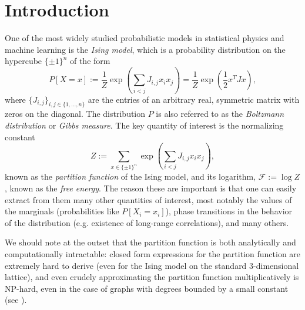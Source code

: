 \documentclass[11pt, oneside, english]{article}
\newcommand{\F}{\mathcal{F}}
\theoremstyle{definition}
\theoremstyle{plain}
\begin{document}
\section{Introduction}
One of the most widely studied probabilistic models in statistical physics and machine learning is the \emph{Ising model}, which is a probability distribution on the hypercube $\{\pm1\}^n$ of the form
\[ P[X = x] := \frac{1}{Z} \exp\left(\sum_{i < j} J_{i,j} x_i x_j\right) = \frac{1}{Z} \exp\left(\frac{1}{2} x^T J x\right), \]
where $\{J_{i,j}\}_{i,j\in\{1,\dots,n\}}$ are the entries of
an arbitrary real, symmetric matrix with zeros on the diagonal. The distribution $P$ is also referred to as the \emph{Boltzmann distribution} or \emph{Gibbs measure}. 
The key quantity of interest is the normalizing constant $$Z:=\sum_{x\in\{\pm1\}^{n}}\exp\left(\sum_{i < j}J_{i,j}x_{i}x_{j}\right),$$
known as the \emph{partition function }of the Ising model, and its logarithm, $\F := \log{Z}$, known as the \emph{free energy}. The reason these are important is that one can easily extract from them many other quantities of interest,  most notably the values of the marginals (probabilities like $P[X_i = x_i]$), phase transitions in the behavior of the distribution (e.g. existence of long-range correlations), and many others. 

We should note at the outset that the partition function is both analytically and computationally intractable: closed form expressions for the partition function are extremely hard to derive (even for the Ising model on the standard $3$-dimensional lattice), %
and even crudely approximating the partition function multiplicatively is NP-hard, even in the case of graphs with degrees bounded by a small constant (see \cite{sly-sun}). 
\end{document}
